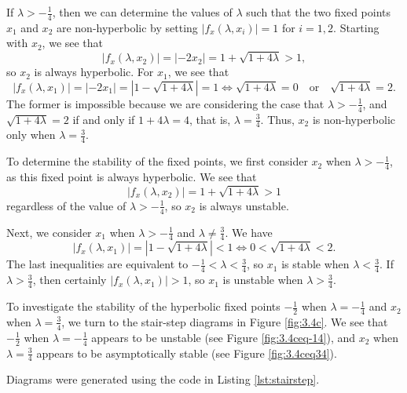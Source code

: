 \documentclass[nonumber]{homework}
\begin{document}
	If $\lambda > -\frac{1}{4}$, then we can determine the values of $\lambda$ such that the two fixed points $x_1$ and $x_2$ are non-hyperbolic by setting $|f_x(\lambda, x_i)| = 1$ for $i = 1,2$. Starting with $x_2$, we see that
	\begin{equation*}
		|f_x(\lambda, x_2)| = |-2x_2| = 1 + \sqrt{1+4\lambda} > 1,
	\end{equation*}
	so $x_2$ is always hyperbolic. For $x_1$, we see that
	\begin{equation*}
		|f_x(\lambda, x_1)| = |-2x_1| = \left|1-\sqrt{1+4\lambda}\right| = 1 \iff \sqrt{1+4\lambda} = 0 \quad\text{or}\quad \sqrt{1+4\lambda} = 2.
	\end{equation*}
	The former is impossible because we are considering the case that $\lambda > -\frac{1}{4}$, and $\sqrt{1+4\lambda} = 2$ if and only if $1 + 4\lambda = 4$, that is, $\lambda = \frac{3}{4}$. Thus, $x_2$ is non-hyperbolic only when $\lambda = \frac{3}{4}$.
	
	To determine the stability of the fixed points, we first consider $x_2$ when $\lambda > -\frac{1}{4}$, as this fixed point is always hyperbolic. We see that
	\begin{equation*}
		|f_x(\lambda, x_2)| = 1 + \sqrt{1+4\lambda} > 1
	\end{equation*}
	regardless of the value of $\lambda > -\frac{1}{4}$, so $x_2$ is always unstable.
	
	Next, we consider $x_1$ when $\lambda > -\frac{1}{4}$ and $\lambda \ne \frac{3}{4}$. We have
	\begin{equation*}
		|f_x(\lambda, x_1)| = \left|1-\sqrt{1+4\lambda}\right| < 1 \iff 0 < \sqrt{1 + 4\lambda} < 2.
	\end{equation*}
	The last inequalities are equivalent to $-\frac{1}{4} < \lambda < \frac{3}{4}$, so $x_1$ is stable when $\lambda < \frac{3}{4}$. If $\lambda > \frac{3}{4}$, then certainly $|f_x(\lambda, x_1)| > 1$, so $x_1$ is unstable when $\lambda > \frac{3}{4}$.
	
	To investigate the stability of the hyperbolic fixed points $-\frac{1}{2}$ when $\lambda = -\frac{1}{4}$ and $x_2$ when $\lambda = \frac{3}{4}$, we turn to the stair-step diagrams in Figure \ref{fig:3.4c}. We see that $-\frac{1}{2}$ when $\lambda = -\frac{1}{4}$ appears to be unstable (see Figure \ref{fig:3.4ceq-14}), and $x_2$ when $\lambda = \frac{3}{4}$ appears to be asymptotically stable (see Figure \ref{fig:3.4ceq34}).
	
	Diagrams were generated using the code in Listing \ref{lst:stairstep}.
	
\end{document}
